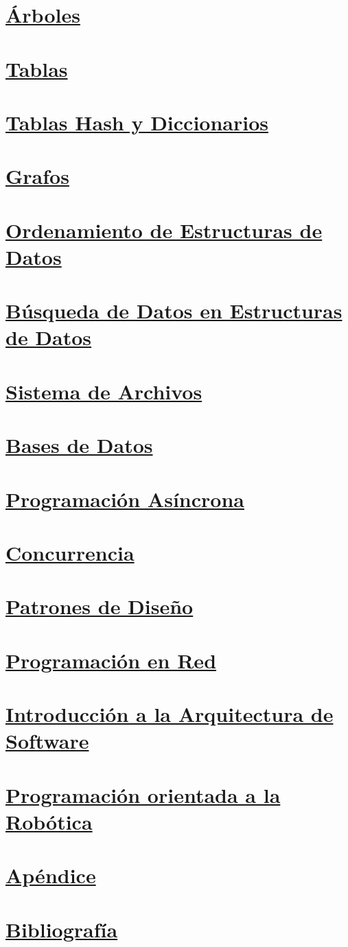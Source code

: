 \documentclass[a4paper, 12pt]{article}
\begin{document}
    \newpage\section*{\textbf{\underline{Árboles}}}
    \newpage\section*{\textbf{\underline{Tablas}}}
    \newpage\section*{\textbf{\underline{Tablas Hash y Diccionarios}}}
    \newpage\section*{\textbf{\underline{Grafos}}}
    \newpage\section*{\textbf{\underline{Ordenamiento de Estructuras de Datos}}}
    \newpage\section*{\textbf{\underline{Búsqueda de Datos en Estructuras de Datos}}}
    \newpage\section*{\textbf{\underline{Sistema de Archivos}}}
    \newpage\section*{\textbf{\underline{Bases de Datos}}}
    \newpage\section*{\textbf{\underline{Programación Asíncrona}}}
    \newpage\section*{\textbf{\underline{Concurrencia}}}
    \newpage\section*{\textbf{\underline{Patrones de Diseño}}}
    \newpage\section*{\textbf{\underline{Programación en Red}}}
    \newpage\section*{\textbf{\underline{Introducción a la Arquitectura de Software}}}
    \newpage\section*{\textbf{\underline{Programación orientada a la Robótica}}}
    \newpage\section*{\textbf{\underline{Apéndice}}}
    \newpage\section*{\textbf{\underline{Bibliografía}}}
\end{document}

